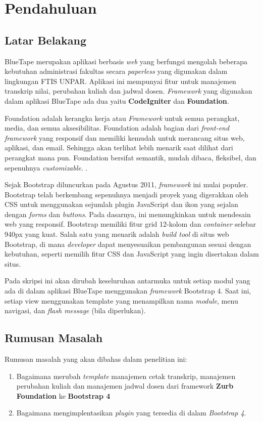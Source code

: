 \chapter{Pendahuluan}
\label{chap:intro}
   
\section{Latar Belakang}
\label{sec:label}

\par BlueTape merupakan aplikasi berbasis \textit{web} yang berfungsi mengolah beberapa kebutuhan administrasi fakultas secara \textit{paperless} yang digunakan dalam lingkungan FTIS UNPAR.  Aplikasi ini mempunyai fitur untuk manajemen transkrip nilai, perubahan kuliah dan jadwal dosen. \textit{Framework} yang digunakan dalam aplikasi BlueTape ada dua yaitu \textbf{CodeIgniter} dan \textbf{Foundation}.  \par
Foundation adalah kerangka kerja atau \textit{Framework } untuk semua perangkat, media, dan semua aksesibilitas. Foundation adalah bagian dari \textit{front-end framework}  yang responsif dan memiliki kemudah untuk merancang situs web, aplikasi, dan email. Sehingga akan terlihat lebih menarik saat dilihat dari perangkat mana pun. Foundation bersifat semantik, mudah dibaca, fleksibel, dan sepenuhnya \textit{customizable}.
\cite{zurbfoundation:17}.\par
Sejak Bootstrap diluncurkan pada Agustus 2011, \textit{framework} ini mulai populer. Bootstrap telah berkembang sepenuhnya menjadi proyek yang digerakkan oleh CSS untuk menggunakan sejumlah plugin JavaScript dan ikon yang sejalan dengan \textit{forms} dan \textit{buttons}. Pada dasarnya, ini memungkinkan untuk mendesain web yang responsif. Bootstrap memiliki fitur grid 12-kolom dan \textit{container} selebar 940px yang kuat. Salah satu yang menarik adalah \textit{build tool} di situs web Bootstrap, di mana \textit{developer} dapat menyesuaikan pembangunan sesuai dengan kebutuhan, seperti memilih fitur CSS dan JavaScript yang ingin disertakan dalam situs. \cite{bootstrap:19}\par
Pada skripsi ini akan dirubah keseluruhan  antarmuka untuk setiap modul yang ada di dalam aplikasi BlueTape menggunakan \textit{framework} Bootstrap 4. Saat ini, setiap view menggunakan template yang menampilkan nama \textit{module}, menu navigasi, dan \textit{flash message} (bila diperlukan).


\section{Rumusan Masalah}
\label{sec:rumusan}
Rumusan masalah yang akan dibahas dalam penelitian ini:
\begin{enumerate}
	\item Bagaimana merubah \textit{template} manajemen cetak transkrip, manajemen perubahan kuliah dan manajemen jadwal dosen dari framework \textbf{Zurb Foundation} ke \textbf{Bootstrap 4}
	\item Bagaimana mengimplentasikan \textit{plugin} yang tersedia di dalam \textit{Bootstrap 4}.
\end{enumerate}

